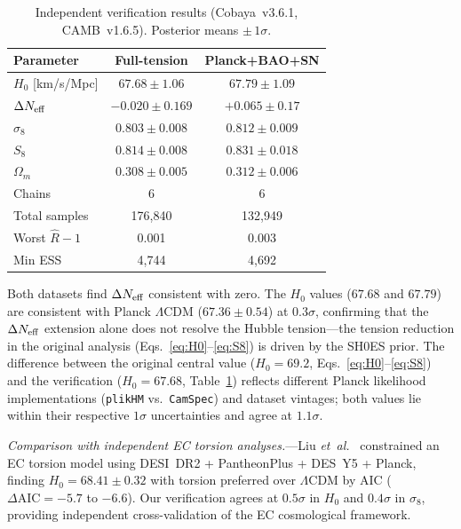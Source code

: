 \documentclass[aps,prd,twocolumn,superscriptaddress,showpacs,preprintnumbers,
  nofootinbib,longbibliography,floatfix]{revtex4-2}
\newcommand{\Neff}{N_{\rm eff}}
\newcommand{\etal}{\textit{et~al.}}
\begin{document}
\begin{table}[h]
\caption{\label{tab:verification} Independent verification results
(Cobaya~v3.6.1, CAMB~v1.6.5). Posterior means $\pm\,1\sigma$.}
\begin{ruledtabular}
\begin{tabular}{lcc}
\textbf{Parameter} & \textbf{Full-tension} & \textbf{Planck+BAO+SN} \\
\hline
$H_0$ [km/s/Mpc] & $67.68 \pm 1.06$ & $67.79 \pm 1.09$ \\
$\Delta\Neff$ & $-0.020 \pm 0.169$ & $+0.065 \pm 0.17$ \\
$\sigma_8$ & $0.803 \pm 0.008$ & $0.812 \pm 0.009$ \\
$S_8$ & $0.814 \pm 0.008$ & $0.831 \pm 0.018$ \\
$\Omega_m$ & $0.308 \pm 0.005$ & $0.312 \pm 0.006$ \\
\hline
Chains & 6 & 6 \\
Total samples & 176{,}840 & 132{,}949 \\
Worst $\hat{R}-1$ & 0.001 & 0.003 \\
Min ESS & 4{,}744 & 4{,}692 \\
\end{tabular}
\end{ruledtabular}
\end{table}

Both datasets find $\Delta\Neff$ consistent with zero. The $H_0$ values
($67.68$ and $67.79$) are consistent with Planck $\Lambda$CDM
($67.36 \pm 0.54$) at $0.3\sigma$, confirming that the $\Delta\Neff$
extension alone does not resolve the Hubble tension---the tension
reduction in the original analysis (Eqs.~\ref{eq:H0}--\ref{eq:S8}) is
driven by the SH0ES prior.
The difference between the original central value ($H_0 = 69.2$,
Eqs.~\ref{eq:H0}--\ref{eq:S8}) and the verification
($H_0 = 67.68$, Table~\ref{tab:verification}) reflects different
Planck likelihood implementations (\texttt{plikHM} vs.\ \texttt{CamSpec})
and dataset vintages; both values lie within their respective
$1\sigma$ uncertainties and agree at $1.1\sigma$.

\textit{Comparison with independent EC torsion analyses.}---Liu
\etal~\cite{ECTorsionDESI2025} constrained an EC torsion model using
DESI~DR2 + PantheonPlus + DES~Y5 + Planck, finding $H_0 = 68.41 \pm
0.32$ with torsion preferred over $\Lambda$CDM by AIC
($\Delta\text{AIC} = -5.7$ to $-6.6$). Our verification agrees at
$0.5\sigma$ in $H_0$ and $0.4\sigma$ in $\sigma_8$, providing
independent cross-validation of the EC cosmological framework.
\end{document}
